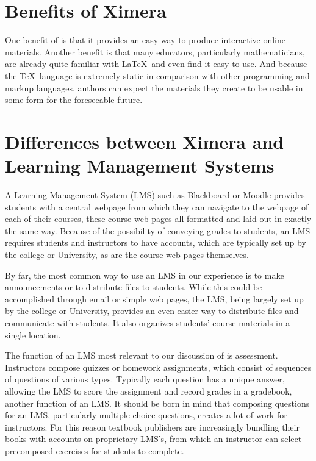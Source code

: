 \documentclass{ximera}
\begin{document}
\section{Benefits of Ximera}
One benefit of  is that it
provides an easy way to produce interactive online materials.  Another
benefit is that many educators, particularly mathematicians, are
already quite familiar with \LaTeX\ and even find it easy to use.  And
because the \TeX\ language is extremely static in comparison with
other programming and markup languages, authors can expect the
 materials they create to be
usable in some form for the foreseeable future.

\section{Differences between Ximera and Learning Management Systems}
A Learning Management System (LMS) such as Blackboard or Moodle
provides students with a central webpage from which they can navigate
to the webpage of each of their courses, these course web pages all
formatted and laid out in exactly the same way.  Because of the
possibility of conveying grades to students, an LMS requires students
and instructors to have accounts, which are typically set up by the
college or University, as are the course web pages themselves.

By far, the most common way to use an LMS in our experience is to make
announcements or to distribute files to students.  While this could be
accomplished through email or simple web pages, the LMS, being largely
set up by the college or University, provides an even easier way to
distribute files and communicate with students.  It also organizes
students' course materials in a single location.

The function of an LMS most relevant to our discussion of
 is assessment.  Instructors
compose quizzes or homework assignments, which consist of sequences of
questions of various types.  Typically each question has a unique
answer, allowing the LMS to score the assignment and record grades in
a gradebook, another function of an LMS.  It should be born in mind
that composing questions for an LMS, particularly multiple-choice
questions, creates a lot of work for instructors. For this reason
textbook publishers are increasingly bundling their books with
accounts on proprietary LMS's, from which an instructor can select
precomposed exercises for students to complete.
\end{document}
